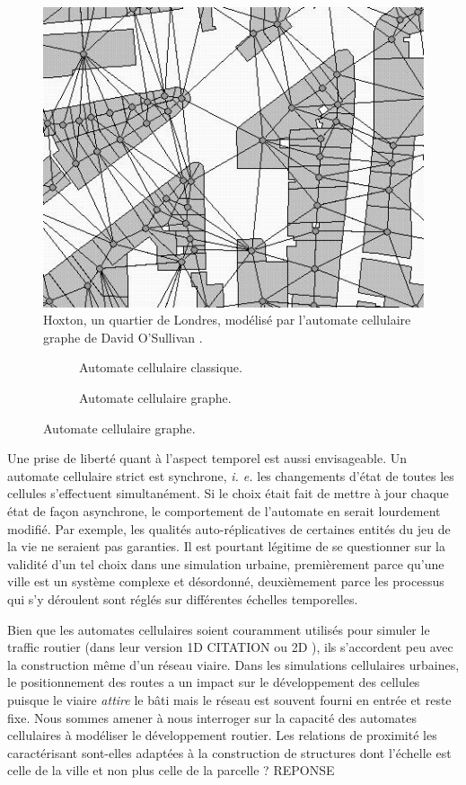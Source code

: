 \documentclass[12pt]{article}
\begin{document}
\begin{figure}[H]
  \centering
  \includegraphics[width=.7\linewidth]{images/gca.png}
  \caption{Hoxton, un quartier de Londres, modélisé par l'automate
    cellulaire graphe de David O'Sullivan \cite{O'Sullivan2000}.}
  \label{fig:sullivan}
\end{figure}

\begin{figure}
  \begin{subfigure}[b]{.5\linewidth}
    \centering
    
    \caption{Automate cellulaire classique.}
  \end{subfigure}
  \begin{subfigure}[b]{.5\linewidth}
    \centering
    
    \caption{Automate cellulaire graphe.}
  \end{subfigure}
\end{figure}

Une prise de liberté quant à l'aspect temporel est aussi
envisageable. Un automate cellulaire strict est synchrone,
\textit{i. e.} les changements d'état de toutes les cellules
s'effectuent simultanément. Si le choix était fait de mettre à jour
chaque état de façon asynchrone, le comportement de l'automate en
serait lourdement modifié. Par exemple, les qualités auto-réplicatives
de certaines entités du jeu de la vie ne seraient pas garanties. Il
est pourtant légitime de se questionner sur la validité d'un tel choix
dans une simulation urbaine, premièrement parce qu'une ville est un
système complexe et désordonné, deuxièmement parce les processus qui
s'y déroulent sont réglés sur différentes échelles temporelles.

Bien que les automates cellulaires soient couramment utilisés pour
simuler le traffic routier (dans leur version 1D CITATION ou 2D
\cite{Queloz1996}), ils s'accordent peu avec la construction même d'un
réseau viaire. Dans les simulations cellulaires urbaines, le
positionnement des routes a un impact sur le développement des
cellules puisque le viaire \textit{attire} le bâti mais le réseau est
souvent fourni en entrée et reste fixe. Nous sommes amener à nous
interroger sur la capacité des automates cellulaires à modéliser le
développement routier. Les relations de proximité les caractérisant
sont-elles adaptées à la construction de structures dont l'échelle est
celle de la ville et non plus celle de la parcelle ? REPONSE
\end{document}
